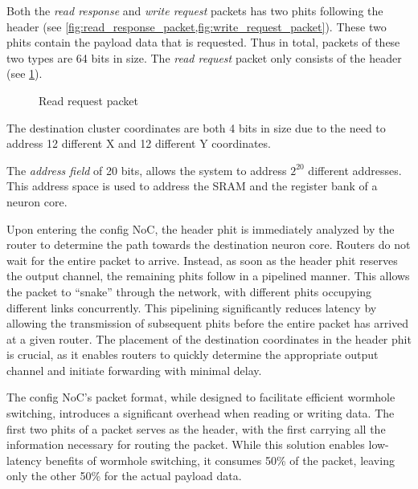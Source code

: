 Both the \textit{read response} and \textit{write request} packets has two phits following the header (see \cref{fig:read_response_packet,fig:write_request_packet}).
These two phits contain the payload data that is requested.
Thus in total, packets of these two types are 64 bits in size.
The \textit{read request} packet only consists of the header (see \cref{fig:read_request_packet}).

\hspace*{0.5em}
\begin{figure}[hbtp]
    \centering
    \begin{adjustbox}{width=0.7\linewidth}
        
    \end{adjustbox}
    \caption{Read request packet}
    \label{fig:read_request_packet}
\end{figure}

The destination cluster coordinates are both 4 bits in size due to the need to address 12 different X and 12 different Y coordinates.

The \textit{address field} of 20 bits, allows the system to address $2^{20}$ different addresses.
This address space is used to address the SRAM and the register bank of a neuron core.

Upon entering the config NoC, the header phit is immediately analyzed by the router to determine the path towards the destination neuron core.
Routers do not wait for the entire packet to arrive.
Instead, as soon as the header phit reserves the output channel, the remaining phits follow in a pipelined manner.
This allows the packet to ``snake'' through the network, with different phits occupying different links concurrently.
This pipelining significantly reduces latency by allowing the transmission of subsequent phits before the entire packet has arrived at a given router.
The placement of the destination coordinates in the header phit is crucial, as it enables routers to quickly determine the appropriate output channel and initiate forwarding with minimal delay.


The config NoC's packet format, while designed to facilitate efficient wormhole switching, introduces a significant overhead when reading or writing data.
The first two phits of a packet serves as the header, with the first carrying all the information necessary for routing the packet.
While this solution enables low-latency benefits of wormhole switching, it consumes 50\% of the packet, leaving only the other 50\% for the actual payload data.

